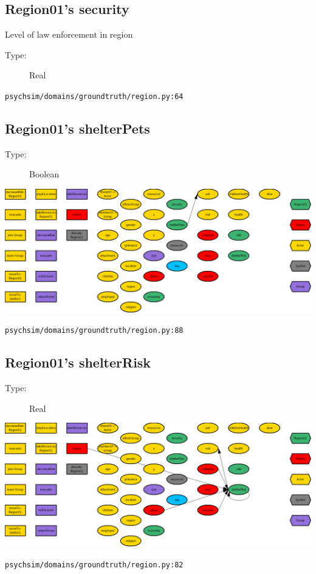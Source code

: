 \documentclass{article}%
\begin{document}
%
\subsection{Region01's security}%
\label{subsec:Region01's security}%
Level of law enforcement in region%
\begin{description}%
\item[Type:]%
Real%
\end{description}%
\begin{flushleft}%
\verb|psychsim/domains/groundtruth/region.py:64|%
\end{flushleft}

%
\subsection{Region01's shelterPets}%
\label{subsec:Region01's shelterPets}%
\begin{description}%
\item[Type:]%
Boolean%
\end{description}%
\includegraphics[width=\textwidth]{images/shelterPetsOfRegion01.png}%
\begin{flushleft}%
\verb|psychsim/domains/groundtruth/region.py:88|%
\end{flushleft}

%
\subsection{Region01's shelterRisk}%
\label{subsec:Region01's shelterRisk}%
\begin{description}%
\item[Type:]%
Real%
\end{description}%
\includegraphics[width=\textwidth]{images/shelterRiskOfRegion01.png}%
\begin{flushleft}%
\verb|psychsim/domains/groundtruth/region.py:82|%
\end{flushleft}%
\end{document}
